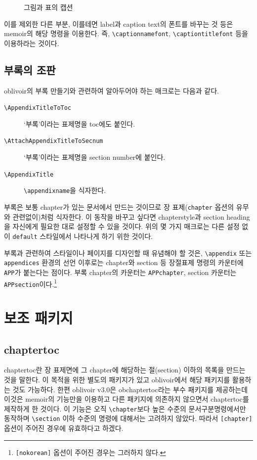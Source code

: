 \documentclass[
	12pt,
	a4paper,
	kosection,
	footnote,
	nobookmarks,
	microtype,
	figtabcapt,
]{oblivoir}
\def\cs#1{\texttt{\textbackslash #1}}
\begin{document}
\begin{figure}[h]
\caption{그림과 표의 캡션}
\end{figure}

이를 제외한 다른 부분, 이를테면 label과 caption text의 폰트를 바꾸는 것 등은 memoir의
해당 명령을 이용한다. 즉, \verb|\captionnamefont|, \verb|\captiontitlefont| 등을 이용하라는 것이다.

\subsection{부록의 조판}

\textsf{oblivoir}의 부록 만들기와 관련하여 알아두어야 하는 매크로는 다음과 같다.
\begin{description}
\item [\cs{AppendixTitleToToc}] `부록'이라는 표제명을 toc에도 붙인다.
\item [\cs{AttachAppendixTitleToSecnum}] `부록'이라는 표제명을 section number에 붙인다.
\item [\cs{AppendixTitle}] \cs{appendixname}을 식자한다.
\end{description}

부록은 보통 chapter가 있는 문서에서 만드는 것이므로 장 표제(\texttt{chapter} 옵션의 유무와 관련없이)처럼 식자한다.
이 동작을 바꾸고 싶다면 chapterstyle과 section heading을 자신에게
필요한 대로 설정할 수 있을 것이다. 위의 몇 가지 매크로는 다른 설정 없이
\texttt{default} 스타일에서 나타나게 하기 위한 것이다.

부록과 관련하여 스타일이나 페이지를 디자인할 때 유념해야 할 것은, \cs{appendix} 또는 \texttt{appendices} 환경의 선언 이후로는
chapter와 section 등 장절표제 명령의 카운터에 \verb|APP|가 붙는다는 점이다. 부록 chapter의 카운터는 \texttt{APPchapter}, section 카운터는 \texttt{APPsection}이다.\footnote{\texttt{[nokorean]} 옵션이 주어진 경우는 그러하지 않다.}

\section{보조 패키지}

\subsection{chaptertoc}

chaptertoc란 장 표제면에 그 chapter에 해당하는 절(section) 이하의 목록을
만드는 것을 말한다. 이 목적을 위한 별도의 패키지가 있고 oblivoir에서 해당 패키지를
활용하는 것도 가능하다. 한편 oblivoir v3.0은 \textsf{obchaptertoc}라는 부수
패키지를 제공하는데 이것은 \textsf{memoir}의 기능만을 이용하고 다른 패키지에
의존하지 않으면서 chaptertoc를 제작하게 한 것이다.
이 기능은 오직 \verb|\chapter|보다 높은 수준의 문서구분명령에서만 동작하며
\verb|\section| 이하 수준의 명령에 대해서는 고려하지 않았다. 따라서 \verb|[chapter]| 옵션이
주어진 경우에 유효하다고 하겠다.
\end{document}
